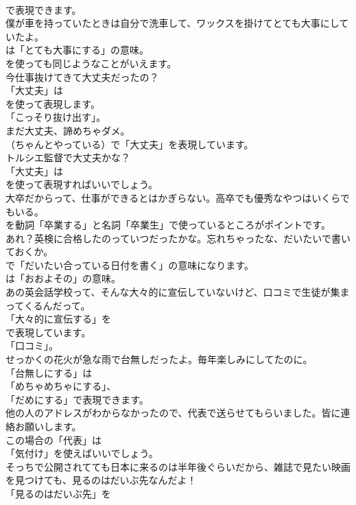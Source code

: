 \documentclass[8pt]{extreport}
\begin{document}
\begin{CJK}{UTF8}{min}
\\	で表現できます。	
\\	僕が車を持っていたときは自分で洗車して、ワックスを掛けてとても大事にしていたよ。 
\\	は「とても大事にする」の意味。
\\	を使っても同じようなことがいえます。	
\\	今仕事抜けてきて大丈夫だったの？ 
\\	「大丈夫」は
\\	を使って表現します。
\\	「こっそり抜け出す」。	
\\	まだ大丈夫、諦めちゃダメ。 
\\	（ちゃんとやっている）で「大丈夫」を表現しています。	
\\	トルシエ監督で大丈夫かな？ 
\\	「大丈夫」は
\\	を使って表現すればいいでしょう。	
\\	大卒だからって、仕事ができるとはかぎらない。高卒でも優秀なやつはいくらでもいる。 
\\	を動詞「卒業する」と名詞「卒業生」で使っているところがポイントです。	
\\	あれ？英検に合格したのっていつだったかな。忘れちゃったな、だいたいで書いておくか。 
\\	で「だいたい合っている日付を書く」の意味になります。
\\	は「おおよその」の意味。	
\\	あの英会話学校って、そんな大々的に宣伝していないけど、口コミで生徒が集まってくるんだって。 
\\	「大々的に宣伝する」を
\\	で表現しています。
\\	「口コミ」。	
\\	せっかくの花火が急な雨で台無しだったよ。毎年楽しみにしてたのに。 
\\	「台無しにする」は
\\	「めちゃめちゃにする」、
\\	「だめにする」で表現できます。	
\\	他の人のアドレスがわからなかったので、代表で送らせてもらいました。皆に連絡お願いします。 
\\	この場合の「代表」は
\\	「気付け」を使えばいいでしょう。	
\\	そっちで公開されてても日本に来るのは半年後ぐらいだから、雑誌で見たい映画を見つけても、見るのはだいぶ先なんだよ！ 
\\	「見るのはだいぶ先」を 

\end{CJK}
\end{document}
